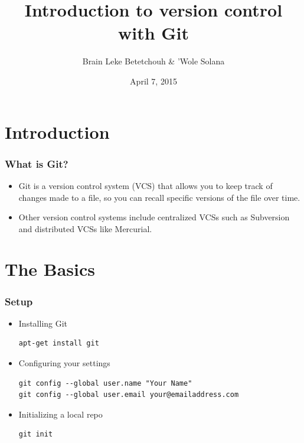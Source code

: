 \documentclass[10pt,t,sans,mathsans,xcolor=dvipsnames]{beamer}
\title{Introduction to version control with Git}
\author{ Brain Leke Betetchouh \& 'Wole Solana }
\date{April 7, 2015}
\begin{document}
\nocite*{}
\frame [c, plain]{\titlepage}
\section{Introduction}
\begin{frame}
\frametitle{What is Git?}
\pause
\begin{itemize}[<+->]
\item Git is a \alert{version control} system (VCS) that allows you to keep track of changes made to a file, so you can recall specific versions of the file over time.
\item Other version control systems include centralized VCSs such as Subversion and distributed VCSs like Mercurial.
\end{itemize}
\end{frame}
\section{The Basics}
\begin{frame}[fragile]
\frametitle{Setup}
\pause
\begin{itemize}[<+->]
\item Installing Git
\begin{lstlisting}
apt-get install git
\end{lstlisting}
\item Configuring your settings
\begin{lstlisting}
git config --global user.name "Your Name"
git config --global user.email your@emailaddress.com
\end{lstlisting}
\item Initializing a local repo
\begin{lstlisting}
git init
\end{lstlisting}
\end{itemize}
\end{frame}
\end{document}
